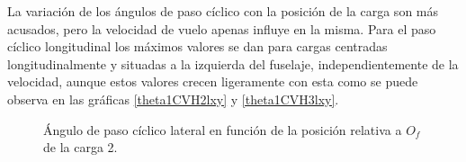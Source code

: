 La variación de los ángulos de paso cíclico con la posición de la carga son más acusados, pero la velocidad de vuelo apenas influye en la misma. Para el paso cíclico longitudinal los máximos valores se dan para cargas centradas longitudinalmente y situadas a la izquierda del fuselaje, independientemente de la velocidad, aunque estos valores crecen ligeramente con esta como se puede observa en las gráficas \ref{theta1CVH2lxy} y \ref{theta1CVH3lxy}.

\begin{figure}
	\centering
	\caption{Ángulo de paso cíclico lateral en función de la posición relativa a $O_f$ de la carga 2.}
	\label{theta1SVH2lxy}
\end{figure}
